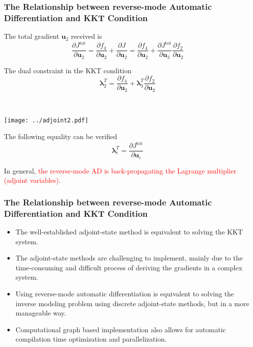 \documentclass{beamer}
\newcommand{\bu}{\mathbf{u}}
\begin{document}
\begin{frame}
\frametitle{The  Relationship between reverse-mode Automatic Differentiation and KKT Condition}

\begin{minipage}[b]{0.48\textwidth}
	The total gradient $\bu_2$ received is
$$  \frac{\partial J^{\mathrm{tot}}}{\partial \bu_2}  = \frac{\partial f_4}{\partial \bu_2} + \frac{\partial J}{\partial \bu_2} = \frac{\partial f_4}{\partial \bu_2} + \frac{\partial J^{\mathrm{tot}}}{\partial \bu_3} \frac{\partial f_2}{\partial \bu_2}$$

The dual constraint in the KKT condition
$$\bm{\lambda}_2^T = \frac{\partial f_4}{\partial  \mathbf{u}_2} + \bm{\lambda}_3^T\frac{\partial f_2}{\partial  \mathbf{u}_2}$$
\end{minipage}~
\begin{minipage}[b]{0.48\textwidth}
\centering
	\texttt{[image: ../adjoint2.pdf]}
\end{minipage}


	 
The following equality can be verified 
\begin{equation*}
	\boxed{\bm{\lambda}_i^T = \frac{\partial J^{\mathrm{tot}}}{\partial \bu_i}}
\end{equation*}

In general, \textcolor{red}{the reverse-mode AD is back-propagating the Lagrange multiplier (adjoint variables)}. 
\end{frame}

\begin{frame}
\frametitle{The  Relationship between reverse-mode Automatic Differentiation and KKT Condition}
\begin{itemize}
	\item The well-established adjoint-state method is equivalent to solving the KKT system. 
	\item The adjoint-state methods are challenging to implement, mainly due to the time-consuming and difficult process of deriving the gradients in a complex system. 
	\item Using reverse-mode automatic differentiation is equivalent to solving the inverse modeling problem using discrete adjoint-state methods, but in a more manageable way. 
	\item Computational graph based implementation also allows for automatic compilation time optimization and parallelization.  
\end{itemize}
	 
\end{frame}
\end{document}
